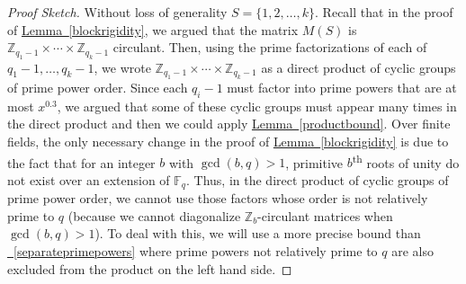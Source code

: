 \documentclass[11pt]{article}
\numberwithin{equation}{section}
\theoremstyle{definition}
\theoremstyle{plain}
\newcommand{\Z}{\mathbb Z}
\newcommand{\expref}[2]{\hyperref[#2]{#1~\ref{#2}}}
\newcommand{\expeqref}[2]{\hyperref[#2]{#1~\eqref{#2}}}
\theoremstyle{definition}
\newcommand\F{{\mathbb{F}}}
\renewcommand\Z{{\mathbb{Z}}}
\newcommand{\ts}{\textsuperscript}
\begin{document}
\begin{proof}[Proof Sketch]
Without loss of generality $S = \{1,2, \dots , k \}$.  Recall that in the proof of \expref{Lemma}{blockrigidity}, we argued that the matrix $M(S)$ is $\Z_{q_1-1} \times \cdots \times \Z_{q_k - 1}$ circulant.  Then, using the prime factorizations of each of $q_1 -1, \dots , q_k - 1$, we wrote $\Z_{q_1-1} \times \cdots \times \Z_{q_k - 1}$ as a direct product of cyclic groups of prime power order.  Since each $q_i - 1$ must factor into prime powers that are at most $x^{0.3}$, we argued that some of these cyclic groups must appear many times in the direct product and then we could apply \expref{Lemma}{productbound}.  Over finite fields, the only necessary change in the proof of \expref{Lemma}{blockrigidity} is due to the fact that for an integer $b$ with $\gcd(b,q) > 1$, primitive $b$\ts{th} roots of unity do not exist over an extension of $\F_q$.  Thus, in the direct product of cyclic groups of prime power order, we cannot use those factors whose order is not relatively prime to $q$ (because we cannot diagonalize $\Z_b$-circulant matrices when $\gcd(b,q) > 1$).  To deal with this, we will use a more precise bound than \expeqref{}{separateprimepowers} where prime powers not relatively prime to $q$ are also excluded from the product on the left hand side.


\end{proof}
\end{document}
